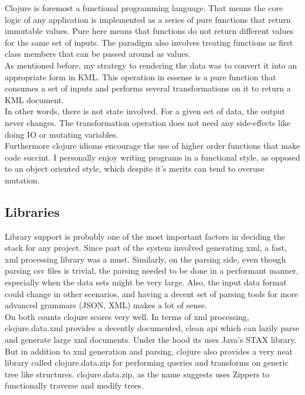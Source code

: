 Clojure is foremost a functional programming language. That means the core logic of any application is implemented as a series of pure functions that return immutable values. Pure here means that functions do not return different values for the same set of inputs. The paradigm also involves treating functions as first class members that can be passed around as values. \\

As mentioned before, my strategy to rendering the data was to convert it into an appropriate form in KML. This operation in essense is a pure function that consumes a set of inputs and performs several transformations on it to return a KML document. \\

In other words, there is not state involved. For a given set of data, the output never changes. The transformation operation does not need any side-effects like doing IO or mutating variables.\\

Furthermore clojure idioms encourage the use of higher order functions that make code succint. I personally enjoy writing programs in a functional style, as opposed to an object oriented style, which despite it's merits can tend to overuse mutation.

\subsection{Libraries}

Library support is probably one of the most important factors in deciding the stack for any project. Since part of the system involved generating xml, a fast, xml processing library was a must. Similarly, on the parsing side, even though parsing csv files is trivial, the parsing needed to be done in a performant manner, especially when the data sets might be very large. Also, the input data format could change in other scenarios, and having a decent set of parsing tools for more advanced grammars (JSON, XML) makes a lot of sense.\\

On both counts clojure scores very well. In terms of xml processing, clojure.data.xml provides  a decently documented, clean api which can lazily parse and generate large xml documents. Under the hood its uses Java's STAX library.\\

But in addition to xml generation and parsing, clojure also provides a very neat library called clojure.data.zip for performing queries and transforms on generic tree like structures. clojure.data.zip, as the name suggests uses Zippers to functionally traverse and modify trees.\\


